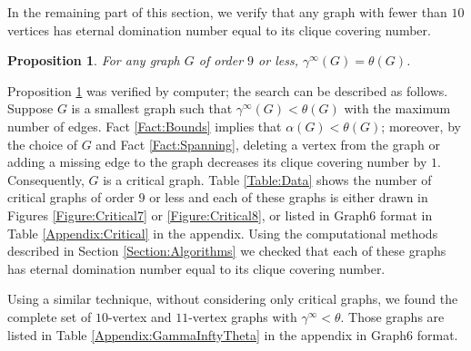 \documentclass[11pt]{article}
\newtheorem{prop}[thm]{Proposition}
\begin{document}
	
	In the remaining part of this section, we verify that any graph with fewer than $10$ vertices has eternal domination number equal to its clique covering number. 
	
	\begin{prop} \label{Proposition:GammaInftyEqualTheta}
		For any graph $G$ of order $9$ or less, $\gamma^\infty(G)=\theta(G)$.
	\end{prop}
	
	Proposition \ref{Proposition:GammaInftyEqualTheta} was verified by computer; the search can be described as follows. Suppose $G$ is a smallest graph such that $\gamma^\infty(G)<\theta(G)$ with the maximum number of edges. Fact \ref{Fact:Bounds} implies that $\alpha(G)<\theta(G)$; moreover, by the choice of $G$ and Fact \ref{Fact:Spanning}, deleting a vertex from the graph or adding a missing edge to the graph decreases its clique covering number by $1$. Consequently, $G$ is a critical graph. Table \ref{Table:Data} shows the number of critical graphs of order $9$ or less and each of these graphs is either drawn in Figures \ref{Figure:Critical7} or \ref{Figure:Critical8}, or listed in Graph6 format in Table \ref{Appendix:Critical} in the appendix. Using the computational methods described in Section \ref{Section:Algorithms} we checked that each of these graphs has eternal domination number equal to its clique covering number.
	
	Using a similar technique, without considering only critical graphs, we found the complete set of $10$-vertex and $11$-vertex graphs with $\gamma^\infty<\theta$. Those graphs are listed in Table \ref{Appendix:GammaInftyTheta} in the appendix in Graph6 format. 

		
\end{document}
